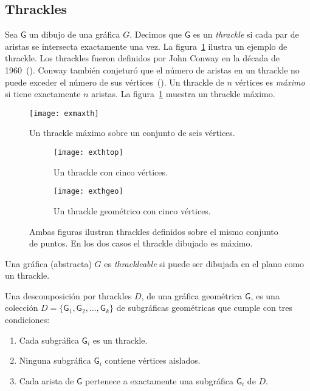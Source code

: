 \subsection{Thrackles} \label{seccion_thrackles}
Sea $\mathsf{G}$ un dibujo de una gráfica $G$. Decimos que $\mathsf{G}$ es un
\emph{thrackle} si cada par de aristas se intersecta exactamente una vez. La
figura~\ref{fig:exmaxth} ilustra un ejemplo de thrackle.
Los thrackles fueron definidos por John Conway en la década de
1960~(\cite{Pach2013}). Conway también conjeturó que el número de aristas en un
thrackle no puede exceder el número de sus vértices~(\cite{Fulek2011}).
Un thrackle de $n$ vértices es \emph{máximo} si tiene exactamente
$n$ aristas. La figura~\ref{fig:exmaxth} muestra un thrackle máximo.

\begin{figure}[htpb]
  \centering
  \texttt{[image: exmaxth]}
  \caption{Un thrackle máximo sobre un conjunto de seis vértices.}
  \label{fig:exmaxth}
\end{figure}

\begin{figure}[htb]
  \centering
\begin{subfigure}[h]{.4\textwidth}
  \centering
  \texttt{[image: exthtop]}
  \caption{Un thrackle con cinco vértices.}
  \label{fig:exthtop}
\end{subfigure}\hfill%
\begin{subfigure}[h]{.4\textwidth}
  \centering
  \texttt{[image: exthgeo]}
  \caption{Un thrackle geométrico con cinco vértices.}
  \label{fig:exthgeo}
\end{subfigure}
\caption{Ambas figuras ilustran thrackles definidos sobre el mismo conjunto de
puntos. En los dos casos el thrackle dibujado es máximo.}
\label{fig:exthgeotop}
\end{figure}

Una gráfica (abstracta) $G$ es \emph{thrackleable} si puede ser dibujada en el plano como un thrackle.

Una descomposición por thrackles $D$, de una gráfica geométrica
$\mathsf{G}$, es una colección $D=\{\mathsf{G}_1,\mathsf{G}_2,\dots,\mathsf{G}_k\}$
de subgráficas geométricas que cumple con tres condiciones:
\begin{enumerate}
  \item Cada subgráfica $\mathsf{G}_i$ es un thrackle.
  \item Ninguna subgráfica $\mathsf{G}_i$ contiene vértices aislados.
  \item Cada arista de $\mathsf{G}$ pertenece a exactamente una subgráfica
  $\mathsf{G}_i$ de $D$.
\end{enumerate}


